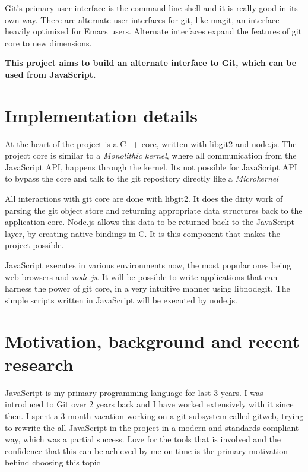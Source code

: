 Git's primary user interface is the command line shell and it is really good in
its own way. There are alternate user interfaces for git, like
magit\cite{magit}, an interface heavily optimized for Emacs\cite{emacs} users.
Alternate interfaces expand the features of git core to new dimensions.

\textbf{This project aims to build an alternate interface to Git, which can be
  used from JavaScript.}

\section{Implementation details}

At the heart of the project is a C++ core, written with libgit2 and node.js. The
project core is similar to a \textit{Monolithic kernel}\cite{monolithic_kernel},
where all communication from the JavaScript API, happens through the kernel. Its
not possible for JavaScript API to bypass the core and talk to the git
repository directly like a \textit{Microkernel}\cite{microkernel}

All interactions with git core are done with libgit2. It does the dirty work of
parsing the git object store and returning appropriate data structures back to
the application core. Node.js allows this data to be returned back to the
JavaScript layer, by creating native bindings in C. It is this component that
makes the project possible.

JavaScript executes in various environments now, the most popular ones being web
browsers and \textit{node.js}. It will be possible to write applications that
can harness the power of git core, in a very intuitive manner using libnodegit.
The simple scripts written in JavaScript will be executed by node.js.

\section{Motivation, background and recent research}

JavaScript is my primary programming language for last 3 years. I was introduced
to Git over 2 years back and I have worked extensively with it since then. I
spent a 3 month vacation working on a git subsystem called gitweb, trying to
rewrite the all JavaScript in the project in a modern and standards compliant
way, which was a partial success. Love for the tools that is involved and the
confidence that this can be achieved by me on time is the primary motivation
behind choosing this topic

